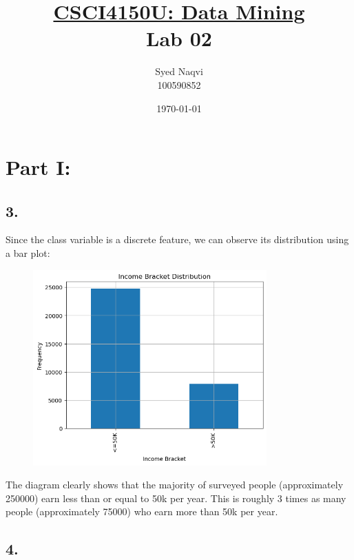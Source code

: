 \documentclass{article}
\title{\textbf{\underline{CSCI4150U: Data Mining}\\Lab 02}}
\author{Syed Naqvi\\100590852}
\date{\today}
\begin{document}
    \maketitle
    
    \section*{Part I:}

    \subsection*{3.}
    
    \begin{center}
        \begin{minipage}[t]{0.9\textwidth}
            Since the class variable is a discrete feature, we can observe its
            distribution using a bar plot:
            \begin{figure}[H]
                \centering
                \includegraphics[width=0.8\textwidth, height=0.4\textheight]{./1_3.png}
            \end{figure}
            The diagram clearly shows that the majority of surveyed people (approximately 250000)
            earn less than or equal to 50k per year. This is roughly 3 times as many people
            (approximately 75000) who earn more than 50k per year.        
        \end{minipage}
    \end{center}

    \subsection*{4.}
    
\end{document}
